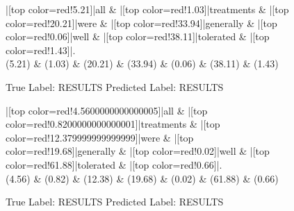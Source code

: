 \documentclass[a4paper, landscape]{article}
\begin{document}
\begin{figure}
\begin{center}
\begin{dependency}
\begin{deptext}
|[top color=red!5.21]|all \& |[top color=red!1.03]|treatments \& |[top color=red!20.21]|were \& |[top color=red!33.94]|generally \& |[top color=red!0.06]|well \& |[top color=red!38.11]|tolerated \& |[top color=red!1.43]|.\\
(5.21) \& (1.03) \& (20.21) \& (33.94) \& (0.06) \& (38.11) \& (1.43)\\
\end{deptext}
\end{dependency}
\end{center}
\caption{True Label: RESULTS Predicted Label: RESULTS}
\end{figure}
\clearpage
\begin{figure}
\begin{center}
\begin{dependency}
\begin{deptext}
|[top color=red!4.5600000000000005]|all \& |[top color=red!0.8200000000000001]|treatments \& |[top color=red!12.379999999999999]|were \& |[top color=red!19.68]|generally \& |[top color=red!0.02]|well \& |[top color=red!61.88]|tolerated \& |[top color=red!0.66]|.\\
(4.56) \& (0.82) \& (12.38) \& (19.68) \& (0.02) \& (61.88) \& (0.66)\\
\end{deptext}
\end{dependency}
\end{center}
\caption{True Label: RESULTS Predicted Label: RESULTS}
\end{figure}
\clearpage
\end{document}
